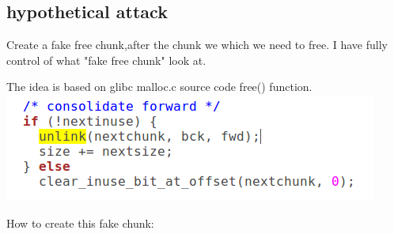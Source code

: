 \documentclass[12pt]{article}
\begin{document}
\subsection{hypothetical attack}
Create a fake free chunk,after the chunk we which we need to free. I have fully control of what "fake free chunk" look at. 

The idea is based on glibc malloc.c source code free() function. \\
\includegraphics[scale=0.3]{unlink_next_free_chunk.png}
 
How to create this fake chunk:\\
\end{document}
